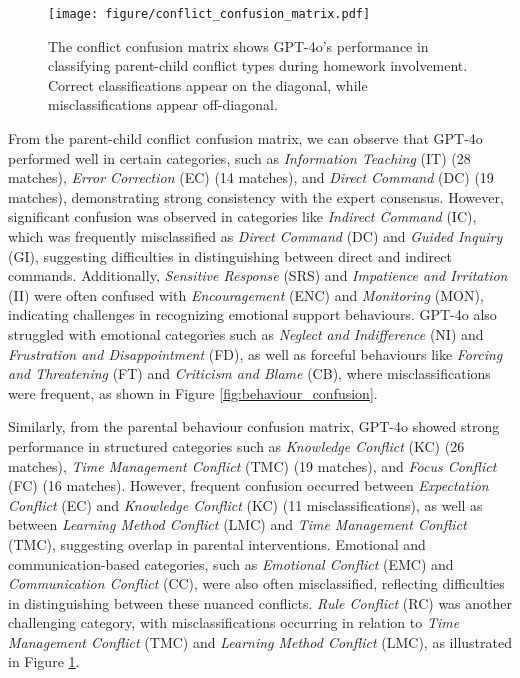 \begin{figure}
    \centering
    \texttt{[image: figure/conflict\_confusion\_matrix.pdf]}
    \caption{The conflict confusion matrix shows GPT-4o’s performance in classifying parent-child conflict types during homework involvement. Correct classifications appear on the diagonal, while misclassifications appear off-diagonal.}
    \label{fig:conflict_confusion}
\end{figure}
From the parent-child conflict confusion matrix, we can observe that GPT-4o performed well in certain categories, such as \textit{Information Teaching} (IT) (28 matches), \textit{Error Correction} (EC) (14 matches), and \textit{Direct Command} (DC) (19 matches), demonstrating strong consistency with the expert consensus. However, significant confusion was observed in categories like \textit{Indirect Command} (IC), which was frequently misclassified as \textit{Direct Command} (DC) and \textit{Guided Inquiry} (GI), suggesting difficulties in distinguishing between direct and indirect commands. Additionally, \textit{Sensitive Response} (SRS) and \textit{Impatience and Irritation} (II) were often confused with \textit{Encouragement} (ENC) and \textit{Monitoring} (MON), indicating challenges in recognizing emotional support behaviours. GPT-4o also struggled with emotional categories such as \textit{Neglect and Indifference} (NI) and \textit{Frustration and Disappointment} (FD), as well as forceful behaviours like \textit{Forcing and Threatening} (FT) and \textit{Criticism and Blame} (CB), where misclassifications were frequent, as shown in Figure \ref{fig:behaviour_confusion}.

Similarly, from the parental behaviour confusion matrix, GPT-4o showed strong performance in structured categories such as \textit{Knowledge Conflict} (KC) (26 matches), \textit{Time Management Conflict} (TMC) (19 matches), and \textit{Focus Conflict} (FC) (16 matches). However, frequent confusion occurred between \textit{Expectation Conflict} (EC) and \textit{Knowledge Conflict} (KC) (11 misclassifications), as well as between \textit{Learning Method Conflict} (LMC) and \textit{Time Management Conflict} (TMC), suggesting overlap in parental interventions. Emotional and communication-based categories, such as \textit{Emotional Conflict} (EMC) and \textit{Communication Conflict} (CC), were also often misclassified, reflecting difficulties in distinguishing between these nuanced conflicts. \textit{Rule Conflict} (RC) was another challenging category, with misclassifications occurring in relation to \textit{Time Management Conflict} (TMC) and \textit{Learning Method Conflict} (LMC), as illustrated in Figure \ref{fig:conflict_confusion}.


